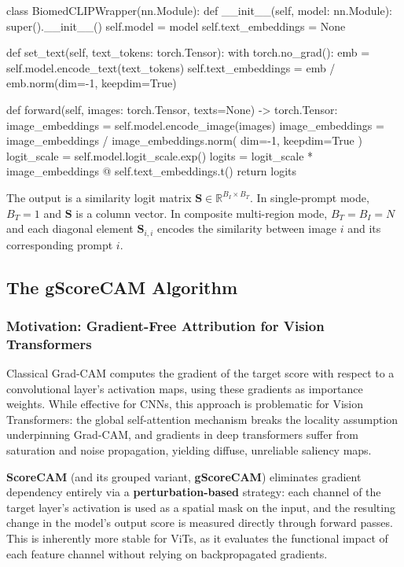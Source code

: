 \begin{pythoncode}[BiomedCLIPWrapper]
class BiomedCLIPWrapper(nn.Module):
    def __init__(self, model: nn.Module):
        super().__init__()
        self.model = model
        self.text_embeddings = None

    def set_text(self, text_tokens: torch.Tensor):
        with torch.no_grad():
            emb = self.model.encode_text(text_tokens)
            self.text_embeddings = emb / emb.norm(dim=-1, keepdim=True)

    def forward(self, images: torch.Tensor, texts=None) -> torch.Tensor:
        image_embeddings = self.model.encode_image(images)
        image_embeddings = image_embeddings / image_embeddings.norm(
            dim=-1, keepdim=True
        )
        logit_scale = self.model.logit_scale.exp()
        logits = logit_scale * image_embeddings @ self.text_embeddings.t()
        return logits
\end{pythoncode}

The output is a similarity logit matrix $\mathbf{S} \in \mathbb{R}^{B_I \times B_T}$. In single-prompt mode, $B_T = 1$ and $\mathbf{S}$ is a column vector. In composite multi-region mode, $B_T = B_I = N$ and each diagonal element $\mathbf{S}_{i,i}$ encodes the similarity between image $i$ and its corresponding prompt $i$.

\subsection{The gScoreCAM Algorithm}
\label{sec:3_3_2}

\subsubsection{Motivation: Gradient-Free Attribution for Vision Transformers}
\label{sec:3_3_2_1}

Classical Grad-CAM computes the gradient of the target score with respect to a convolutional layer's activation maps, using these gradients as importance weights. While effective for CNNs, this approach is problematic for Vision Transformers: the global self-attention mechanism breaks the locality assumption underpinning Grad-CAM, and gradients in deep transformers suffer from saturation and noise propagation, yielding diffuse, unreliable saliency maps.

 \textbf{ScoreCAM} (and its grouped variant, \textbf{gScoreCAM}) eliminates gradient dependency entirely via a \textbf{perturbation-based} strategy: each channel of the target layer's activation is used as a spatial mask on the input, and the resulting change in the model's output score is measured directly through forward passes. This is inherently more stable for ViTs, as it evaluates the functional impact of each feature channel without relying on backpropagated gradients.

